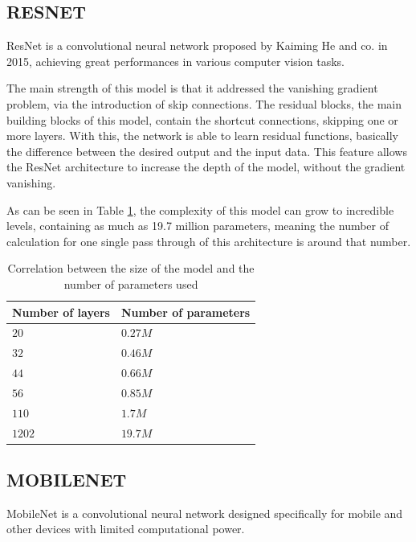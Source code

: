 \subsection{RESNET}
\label{subsec:relatedsec2subsec2}
\par ResNet is a convolutional neural network proposed by Kaiming He and co. in 2015, achieving great performances in various computer vision tasks.
\par The main strength of this model is that it addressed the vanishing gradient problem, via the introduction of skip connections. The residual blocks, the main building blocks of this model, contain the shortcut connections, skipping one or more layers. With this, the network is able to learn  residual functions, basically the difference between the desired output and the input data. This feature allows the ResNet architecture to increase the depth of the model, without the gradient vanishing. \cite{he2015deep}
\par As can be seen in Table \ref{ResNetTable}, the complexity of this model can grow to incredible levels, containing as much as 19.7 million parameters, meaning the number of calculation for one single pass through of this architecture is around that number.

\begin{table}[htbp]
\begin{center}
\begin{tabular}
{|p{120pt}|p{120pt}|}
\hline
Number of layers & Number of parameters\\
\hline 
\hline $20$ & $0.27M$ \\
\hline $32$ & $0.46M$ \\
\hline $44$ & $0.66M$ \\
\hline $56$ & $0.85M$ \\
\hline $110$ & $1.7M$ \\
\hline $1202$ & $19.7M$ \\
\hline
\end{tabular}
\end{center}
\caption{Correlation between the size of the model and the number of parameters used \cite{he2015deep}}
\label{ResNetTable}
\end{table}

\subsection{MOBILENET}
\label{subsec:relatedsec2subsec3}
\par MobileNet is a convolutional neural network designed specifically for mobile and other devices with limited computational power.

